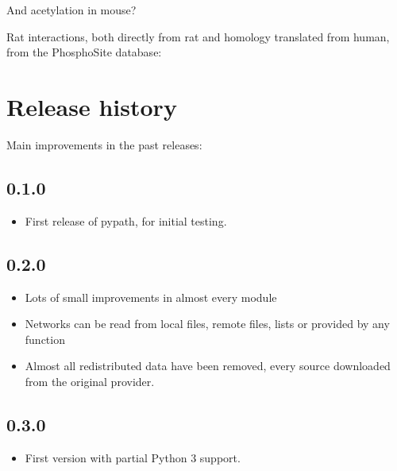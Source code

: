 \documentclass[letterpaper,10pt,english]{sphinxmanual}
\begin{document}
And acetylation in mouse?
\begin{quote}

\end{quote}

Rat interactions, both directly from rat and homology translated from human,
from the PhosphoSite database:
\begin{quote}

\end{quote}


\chapter{Release history}
\label{\detokenize{changelog:release-history}}\label{\detokenize{changelog::doc}}
Main improvements in the past releases:


\section{0.1.0}
\label{\detokenize{changelog:id1}}\begin{itemize}
\item {} 
First release of pypath, for initial testing.

\end{itemize}


\section{0.2.0}
\label{\detokenize{changelog:id2}}\begin{itemize}
\item {} 
Lots of small improvements in almost every module

\item {} 
Networks can be read from local files, remote files, lists or provided by
any function

\item {} 
Almost all redistributed data have been removed, every source downloaded
from the original provider.

\end{itemize}


\section{0.3.0}
\label{\detokenize{changelog:id3}}\begin{itemize}
\item {} 
First version with partial Python 3 support.

\end{itemize}
\end{document}
